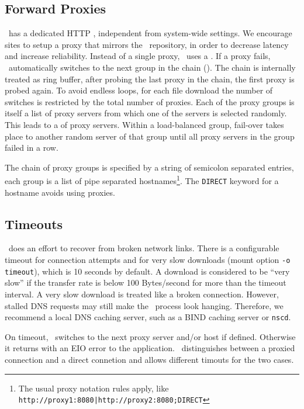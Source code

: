 \subsection{Forward Proxies}
\label{sct:proxies}
\cvmfs\ has a dedicated HTTP , independent from system-wide settings.
We encourage sites to setup a proxy that mirrors the \cvmfs\ repository, in order to decrease latency and increase reliability.
Instead of a single proxy, \cvmfs\ uses a .
If a proxy fails, \cvmfs\ automatically switches to the next group in the chain ().
The chain is internally treated as ring buffer, \ie after probing the last proxy in the chain, the first proxy is probed again.
To avoid endless loops, for each file download the number of switches is restricted by the total number of proxies.
Each of the proxy groups is itself a list of proxy servers from which one of the servers is selected randomly.
This leads to a  of proxy servers.
Within a load-balanced group, fail-over takes place to another random server of that group until all proxy servers in the group failed in a row.

The chain of proxy groups is specified by a string of semicolon separated entries, each group is a list of pipe separated hostnames\footnote{The usual proxy notation rules apply, like \texttt{http://proxy1:8080|http://proxy2:8080;DIRECT}}.
The \texttt{DIRECT} keyword for a hostname avoids using proxies.

\subsection{Timeouts}
\cvmfs\ does an effort to recover from broken network links.
There is a configurable timeout for connection attempts and for very slow downloads (mount option \lstinline{-o timeout}), which is 10 seconds by default.
A download is considered to be ``very slow'' if the transfer rate is below 100 Bytes/second for more than the timeout interval.
A very slow download is treated like a broken connection.
However, stalled DNS requests may still make the \cvmfs\ process look hanging.
Therefore, we recommend a local DNS caching server, such as a BIND caching server or \texttt{nscd}.

On timeout, \cvmfs\ switches to the next proxy server and/or host if defined.
Otherwise it returns with an EIO error to the application.
\cvmfs\ distinguishes between a proxied connection and a direct connetion and allows different timouts for the two cases.

